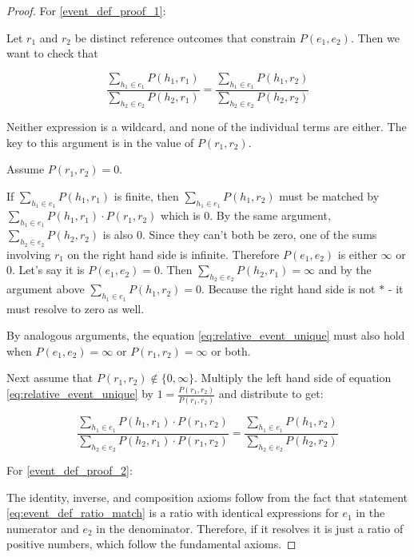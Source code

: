 \documentclass[twoside]{article}
\theoremstyle{plain}%
\theoremstyle{definition}
\theoremstyle{remark}
\begin{document}
\begin{proof}
For \ref{event_def_proof_1}:

Let \(r_1\) and \(r_2\) be distinct reference outcomes that constrain \(P(e_1, e_2)\). Then we want to check that

\begin{equation}
\label{eq:relative_event_unique}
\frac{\sum_{h_1 \in e_1} P(h_1, r_1)}{\sum_{h_2 \in e_2} P(h_2, r_1)} = \frac{\sum_{h_1 \in e_1} P(h_1, r_2)}{\sum_{h_2 \in e_2} P(h_2, r_2)}
\end{equation}

Neither expression is a wildcard, and none of the individual terms are either. The key to this argument is in the value of \(P(r_1, r_2)\).

Assume \(P(r_1, r_2) = 0\). 

If \(\sum_{h_1 \in e_1} P(h_1, r_1)\) is finite, then \(\sum_{h_1 \in e_1} P(h_1, r_2)\) must be matched by \(\sum_{h_1 \in e_1} P(h_1, r_1) \cdot P(r_1, r_2)\) which is 0. By the same argument, \(\sum_{h_2 \in e_2} P(h_2, r_2)\) is also 0. Since they can't both be zero, one of the sums involving \(r_1\) on the right hand side is infinite. Therefore \(P(e_1, e_2)\) is either \(\infty\) or 0. Let's say it is \(P(e_1, e_2) = 0\). Then \(\sum_{h_2 \in e_2} P(h_2, r_1) = \infty\) and by the argument above \(\sum_{h_1 \in e_1} P(h_1, r_2) = 0\). Because the right hand side is not \(\ast\) - it must resolve to zero as well.

By analogous arguments, the equation \ref{eq:relative_event_unique} must also hold when \(P(e_1, e_2) = \infty\) or \(P(r_1, r_2) = \infty\) or both.

Next assume that \(P(r_1, r_2) \notin \{0, \infty\} \). Multiply the left hand side of equation \ref{eq:relative_event_unique} by \(1 = \frac{P(r_1, r_2)}{P(r_1, r_2)}\) and distribute to get:

\[\frac{\sum_{h_1 \in e_1} P(h_1, r_1) \cdot P(r_1, r_2)}{\sum_{h_2 \in e_2} P(h_2, r_1) \cdot P(r_1, r_2)} = \frac{\sum_{h_1 \in e_1} P(h_1, r_2)}{\sum_{h_2 \in e_2} P(h_2, r_2)}\]

For \ref{event_def_proof_2}:

The identity, inverse, and composition axioms follow from the fact that statement \ref{eq:event_def_ratio_match} is a ratio with identical expressions for \(e_1\) in the numerator and \(e_2\) in the denominator. Therefore, if it resolves it is just a ratio of positive numbers, which follow the fundamental axioms.
\end{proof}
\end{document}
